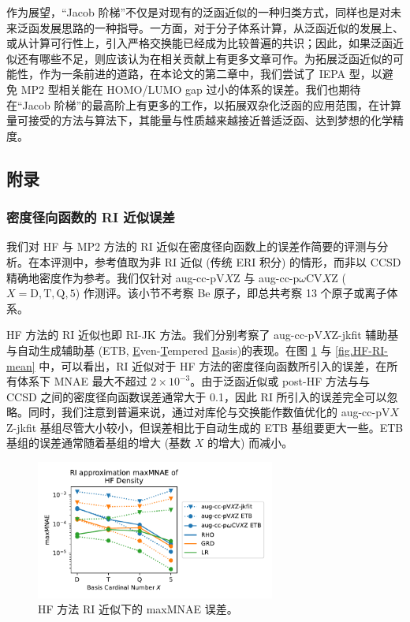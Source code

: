 作为展望，“Jacob 阶梯”不仅是对现有的泛函近似的一种归类方式，同样也是对未来泛函发展思路的一种指导。一方面，对于分子体系计算，从泛函近似的发展上、或从计算可行性上，引入严格交换能已经成为比较普遍的共识；因此，如果泛函近似还有哪些不足，则应该认为在相关贡献上有更多文章可作。为拓展泛函近似的可能性，作为一条前进的道路，在本论文的第二章中，我们尝试了 IEPA 型，以避免 MP2 型相关能在 HOMO/LUMO gap 过小的体系的误差。我们也期待在“Jacob 阶梯”的最高阶上有更多的工作，以拓展双杂化泛函的应用范围，在计算量可接受的方法与算法下，其能量与性质越来越接近普适泛函、达到梦想的化学精度。

\subsection{附录}

\subsubsection{密度径向函数的 RI 近似误差}

我们对 HF 与 MP2 方法的 RI 近似在密度径向函数上的误差作简要的评测与分析。在本评测中，参考值取为非 RI 近似 (传统 ERI 积分) 的情形，而非以 CCSD 精确地密度作为参考。我们仅针对 aug-cc-pV$X$Z 与 aug-cc-p$\omega$CV$X$Z ($X=\mathrm{D,T,Q,5}$) 作测评。该小节不考察 Be 原子，即总共考察 13 个原子或离子体系。

HF 方法的 RI 近似也即 RI-JK 方法。我们分别考察了 aug-cc-pV$X$Z-jkfit 辅助基\cite{Weigend-Weigend.PCCP.2002}与自动生成辅助基 (ETB, \underline{E}ven-\underline{T}empered \underline{B}asis)\cite{Stoychev-Neese.JCTC.2017}的表现。在图 \ref{fig.HF-RI-err} 与 \ref{fig.HF-RI-mean} 中，可以看出，RI 近似对于 HF 方法的密度径向函数所引入的误差，在所有体系下 MNAE 最大不超过 $2 \times 10^{-3}$。由于泛函近似或 post-HF 方法与与 CCSD 之间的密度径向函数误差通常大于 0.1，因此 RI 所引入的误差完全可以忽略。同时，我们注意到普遍来说，通过对库伦与交换能作数值优化的 aug-cc-pV$X$Z-jkfit 基组尽管大小较小，但误差相比于自动生成的 ETB 基组要更大一些。ETB 基组的误差通常随着基组的增大 (基数 $X$ 的增大) 而减小。

\begin{figure}[hp]
  \centering
  \caption{HF 方法 RI 近似下的 maxMNAE 误差。}
  \label{fig.HF-RI-err}
  \includegraphics[width=0.7\textwidth]{assets/HF-RI-err.pdf}
\end{figure}

